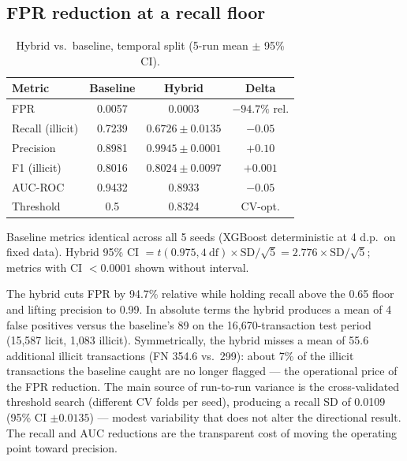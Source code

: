 \documentclass[11pt]{article}
\begin{document}
\subsection{FPR reduction at a recall floor}

\begin{table}[h]
\centering
\caption{Hybrid vs.\ baseline, temporal split (5-run mean $\pm$ 95\% CI).}
\begin{tabular}{lccc}
\toprule
Metric & Baseline & Hybrid & Delta \\
\midrule
FPR             & 0.0057 & 0.0003 & $-94.7\%$ rel. \\
Recall (illicit)& 0.7239 & $0.6726 \pm 0.0135$ & $-0.05$ \\
Precision       & 0.8981 & $0.9945 \pm 0.0001$ & $+0.10$ \\
F1 (illicit)    & 0.8016 & $0.8024 \pm 0.0097$ & $+0.001$ \\
AUC-ROC         & 0.9432 & 0.8933 & $-0.05$ \\
Threshold       & 0.5    & 0.8324 & CV-opt. \\
\bottomrule
\end{tabular}
\begin{flushleft}
\footnotesize Baseline metrics identical across all 5 seeds (XGBoost deterministic at 4 d.p.\ on fixed data).
Hybrid 95\% CI $= t(0.975, 4~\text{df}) \times \text{SD}/\sqrt{5} = 2.776 \times \text{SD}/\sqrt{5}$; metrics with CI $< 0.0001$ shown without interval.
\end{flushleft}
\end{table}

The hybrid cuts FPR by 94.7\% relative while holding recall above the 0.65 floor and lifting precision to 0.99. In absolute terms the hybrid produces a mean of 4 false positives versus the baseline's 89 on the 16,670-transaction test period (15,587 licit, 1,083 illicit). Symmetrically, the hybrid misses a mean of 55.6 additional illicit transactions (FN 354.6 vs.\ 299): about 7\% of the illicit transactions the baseline caught are no longer flagged --- the operational price of the FPR reduction. The main source of run-to-run variance is the cross-validated threshold search (different CV folds per seed), producing a recall SD of 0.0109 (95\% CI $\pm 0.0135$) --- modest variability that does not alter the directional result. The recall and AUC reductions are the transparent cost of moving the operating point toward precision.
\end{document}
